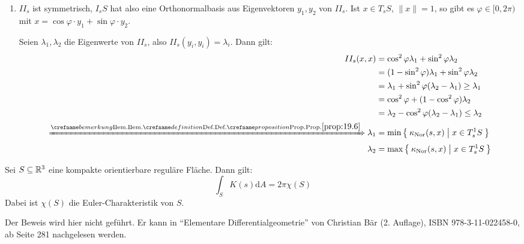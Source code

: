 \begin{beweis}\leavevmode
    \begin{enumerate}[label=\alph*)]
        \item $II_s$ ist symmetrisch, $I_s S$ hat also eine Orthonormalbasis aus
              Eigenvektoren $y_1, y_2$ von $II_s$. Ist $x \in T_s S$, $\|x\| = 1$,
              so gibt es $\varphi \in [0,2\pi)$ mit $x = \cos \varphi \cdot y_1 + \sin \varphi \cdot y_2$.

              Seien $\lambda_1, \lambda_2$ die Eigenwerte von $II_s$, also 
              $II_s(y_i, y_i) = \lambda_i$. Dann gilt:
              \begin{align*}
                  II_s (x,x) &= \cos^2 \varphi \lambda_1 + \sin^2 \varphi \lambda_2\\
                  &= (1- \sin^2 \varphi) \lambda_1 + \sin^2 \varphi \lambda_2\\
                  &= \lambda_1 + \sin^2 \varphi (\lambda_2 - \lambda_1) \geq \lambda_1\\
                  &= \cos^2 \varphi + (1 - \cos^2 \varphi) \lambda_2\\
                  &= \lambda_2 - \cos^2 \varphi (\lambda_2 - \lambda_1) \leq \lambda_2\\
                  \xRightarrow{\crefabbr{prop:19.6}} \lambda_1 &= \min \Set{\kappanor (s,x) | x \in T^1_s S}\\
                  \lambda_2 &= \max \Set{\kappanor (s,x) | x \in T^1_s S}
              \end{align*}
    \end{enumerate}
\end{beweis}

\begin{satz}
    Sei $S \subseteq \mathbb{R}^3$ eine kompakte orientierbare reguläre Fläche. Dann gilt:
    \[\int_S K(s) \mathrm{d}A = 2 \pi \chi(S)\]
    Dabei ist $\chi(S)$ die Euler-Charakteristik von $S$.
\end{satz}

\begin{beweis}
    Der Beweis wird hier nicht geführt. Er kann in \enquote{Elementare Differentialgeometrie}
    von Christian Bär (2. Auflage), ISBN 978-3-11-022458-0, ab Seite 281 nachgelesen werden.
\end{beweis}